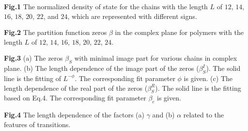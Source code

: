 \documentclass[aps,pre,twocolumn,showpacs,preprintnumbers,amsmath,amssymb]{revtex4-1}
\begin{document}
\vspace{0.5cm}
\parindent 0pt {\large {\bf Fig.1}}
The normalized density of state for the chains with the length $L$ of $12$,
$14$, $16$, $18$, $20$, $22$, and $24$, which are represented with different
signs.

\vspace{0.5cm}
\parindent 0pt {\large {\bf Fig.2}}
The partition function zeros $\beta$ in the complex plane for polymers
with the length $L$ of $12$, $14$, $16$, $18$, $20$, $22$, $24$.

\vspace{0.5cm}
\parindent 0pt {\large {\bf Fig.3}}
(a) The zeros $\beta_S$ with minimal image part for various chains in
complex plane. (b) The length dependence of the image part of the zeros
($\beta_S^I$). The solid line is the fitting of $L^{-\phi}$. The
corresponding fit parameter $\phi$ is given. (c) The length dependence
of the real part of the zeros ($\beta_S^R$). The solid line is
the fitting based on Eq.4. The corresponding fit parameter $\beta_c$ is
given.

\vspace{0.5cm}
\parindent 0pt {\large {\bf Fig.4}}
The length dependence of the factors (a) $\gamma$ and (b) $\alpha$
related to the features of transitions.


\end{document}
